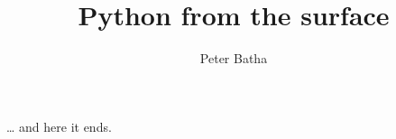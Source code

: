 \documentclass[a4paper,11pt]{article}
\author{Peter Batha}
\title{Python from the surface}
\begin{document}
\maketitle
\tableofcontents
\newpage





\ldots{} and here it ends.
\end{document}
